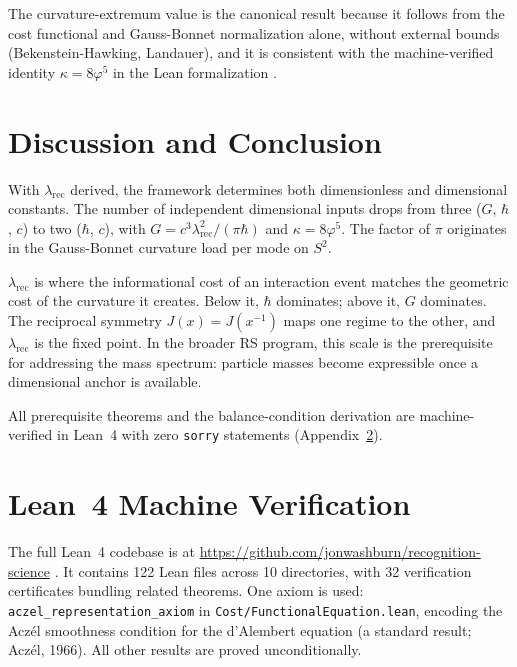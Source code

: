 \documentclass[12pt]{article}
\theoremstyle{definition}
\theoremstyle{remark}
\begin{document}
The curvature-extremum value is the canonical result because it follows
from the cost functional and Gauss-Bonnet normalization alone, without
external bounds (Bekenstein-Hawking, Landauer), and it is consistent
with the machine-verified identity $\kappa = 8\varphi^5$ in the Lean
formalization \cite{WashburnLean4Repo2026}.

\section{Discussion and Conclusion}
\label{sec:conclusion}

With $\lambda_{\mathrm{rec}}$ derived, the framework determines both
dimensionless and dimensional constants. The number of independent
dimensional inputs drops from three ($G$, $\hbar$, $c$) to two
($\hbar$, $c$), with $G = c^3
\lambda_{\mathrm{rec}}^2/(\pi\hbar)$ and $\kappa = 8\varphi^5$.
The factor of $\pi$ originates in the Gauss-Bonnet curvature load
per mode on $S^2$.

$\lambda_{\mathrm{rec}}$ is where the informational cost of an
interaction event matches the geometric cost of the curvature it
creates. Below it, $\hbar$ dominates; above it, $G$ dominates.
The reciprocal symmetry $J(x) = J(x^{-1})$ maps one regime to the
other, and $\lambda_{\mathrm{rec}}$ is the fixed point. In the
broader RS program, this scale is the prerequisite for addressing
the mass spectrum: particle masses become expressible once a
dimensional anchor is available.

All prerequisite theorems and the balance-condition derivation are
machine-verified in Lean~4 with zero \texttt{sorry} statements
(Appendix~\ref{app:lean}).

\appendix

\section{Lean~4 Machine Verification}
\label{app:lean}

The full Lean~4 codebase is at
\url{https://github.com/jonwashburn/recognition-science}
\cite{WashburnLean4Repo2026}. It contains 122 Lean files across 10
directories, with 32 verification certificates bundling related
theorems. One axiom is used:
\texttt{aczel\_representation\_axiom} in
\texttt{Cost/FunctionalEquation.lean}, encoding the Acz\'el
smoothness condition for the d'Alembert equation (a standard result;
Acz\'el, 1966). All other results are proved unconditionally.
\end{document}
